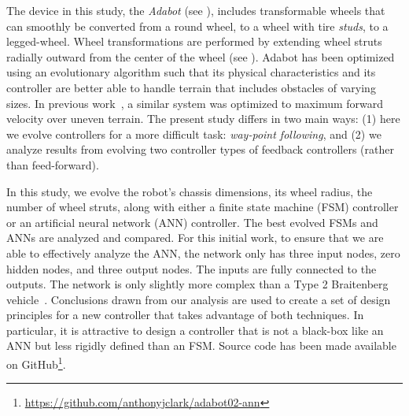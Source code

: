 The device in this study, the \emph{Adabot} (see ), includes transformable wheels that can smoothly be converted from a round wheel, to a wheel with tire \emph{studs}, to a legged-wheel.
%
Wheel transformations are performed by extending wheel struts radially outward from the center of the wheel (see ).
%
Adabot has been optimized using an evolutionary algorithm such that its physical characteristics and its controller are better able to handle terrain that includes obstacles of varying sizes.
%
In previous work~\citep{Clark.2017.SSCI.Adabot}, a similar system was optimized to maximum forward velocity over uneven terrain.
%
The present study differs in two main ways: (1) here we evolve controllers for a more difficult task: \emph{way-point following}, and (2) we analyze results from evolving two controller types of feedback controllers (rather than feed-forward).



In this study, we evolve the robot's chassis dimensions, its wheel radius, the number of wheel struts,
along with either a finite state machine (FSM) controller or an artificial neural network (ANN) controller.
%
The best evolved FSMs and ANNs are analyzed and compared.
%
For this initial work, to ensure that we are able to effectively analyze the ANN, the network only has three input nodes, zero hidden nodes, and three output nodes. The inputs are fully connected to the outputs.
%
The network is only slightly more complex than a Type 2 Braitenberg vehicle~\citep{Braitenberg.Vehicles.Book.1986}.
%
Conclusions drawn from our analysis are used to create a set of design principles for a new controller that takes advantage of both techniques.
%
In particular, it is attractive to design a controller that is not a black-box like an ANN but less rigidly defined than an FSM.
%
%
%
%
%
%
Source code has been made available on GitHub\footnote{\url{https://github.com/anthonyjclark/adabot02-ann}}.

